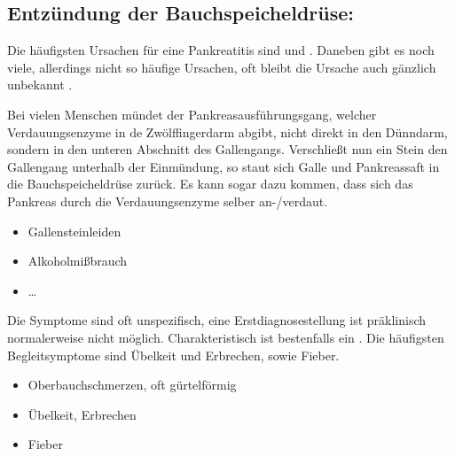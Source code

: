 



\subsection{Entzündung der Bauchspeicheldrüse: }

\label{topic:pankreatitis}



{%
%
%
%
Die häufigsten Ursachen für eine Pankreatitis sind
 und 
\citep{SiewertChirurgie8-07.14-Pankreas,ScholzNotfallmedizin2}.
Daneben gibt es noch viele, allerdings nicht so häufige
Ursachen, oft bleibt die Ursache auch gänzlich unbekannt
\citep{HeroldInnereMedizin2005}.

 Bei vielen Menschen mündet der
Pankreasausführungsgang, welcher Verdauungsenzyme in de
Zwölffingerdarm abgibt, nicht direkt in den Dünndarm,
sondern in den unteren Abschnitt des Gallengangs.
Verschließt nun ein Stein den Gallengang unterhalb der
Einmündung, so staut sich Galle und Pankreassaft in die
Bauchspeicheldrüse zurück. Es kann sogar dazu kommen, dass
sich das Pankreas durch die Verdauungsenzyme selber
an-/verdaut.

}
{\begin{itemize}
  \item Gallensteinleiden
  \item Alkoholmißbrauch
  \item \ldots
\end{itemize}}
{}
{}
{}

\TextSlide{\TxSymptome}
{Die Symptome sind oft unspezifisch, eine
Erstdiagnosestellung ist präklinisch normalerweise nicht
möglich. Charakteristisch ist bestenfalls ein
.
Die häufigsten Begleitsymptome sind Übelkeit und Erbrechen,
sowie Fieber. \citep{HeroldInnereMedizin2005}

\bigskip
}
{\begin{itemize}
  \item Oberbauchschmerzen, oft gürtelförmig
  \item Übelkeit, Erbrechen
  \item Fieber
\end{itemize}}
{}
{}
{}

